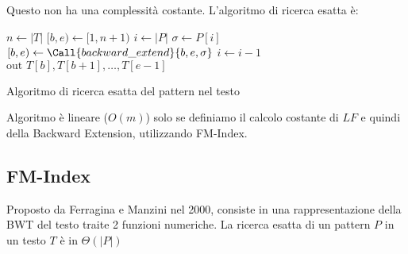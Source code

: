 Questo non ha una complessità costante. L'algoritmo di ricerca esatta è:

\begin{algorithm}
    \begin{algorithmic}
        \State $n \gets |T|$
        \State $[b,e) \gets [1, n+1)$
        \State $i \gets |P|$
        \While{$[b,e) \ \ne \ \text{null}\land i\ge 1$}
        \State $\sigma \gets P[i]$
        \State $[b,e) \gets\Call{backward\_extend}{b,e,\sigma}$
        \State $i\gets i-1$
        \EndWhile
        \If{$[b,e)\ \ne \ \text{null}$}
        \State $\text{out } T[b], T[b+1], \dots, T[e-1]$
        \EndIf
        \EndFunction
    \end{algorithmic}
    \caption{Algoritmo di ricerca esatta del pattern nel testo}
\end{algorithm}

Algoritmo è lineare ($O(m)$) solo se definiamo il calcolo costante di $LF$ e quindi 
della Backward Extension, utilizzando FM-Index.
\subsection{FM-Index}
Proposto da Ferragina e Manzini nel 2000, consiste in una rappresentazione della
BWT del testo traite 2 funzioni numeriche. La ricerca esatta di un pattern $P$ in
un testo $T$ è in $\Theta(|P|)$

